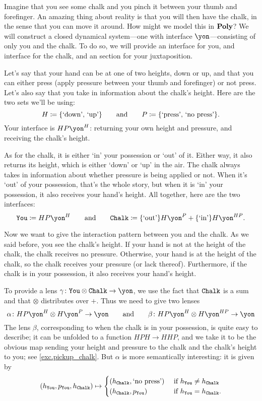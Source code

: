 \documentclass[Book-Poly]{subfiles}
\begin{document}
\begin{example}\label{ex.pickup_chalk}
Imagine that you see some chalk and you pinch it between your thumb and forefinger.
An amazing thing about reality is that you will then have the chalk, in the sense that you can move it around.
How might we model this in $\mathbf{Poly}$?
We will construct a closed dynamical system---one with interface $\yon$---consisting of only you and the chalk.
To do so, we will provide an interface for you, and interface for the chalk, and an section for your juxtaposition.

Let's say that your hand can be at one of two heights, down or up, and that you can either press (apply pressure between your thumb and forefinger) or not press. Let's also say that you take in information about the chalk's height. Here are the two sets we'll be using:
\[
	H\coloneqq\{\text{`down', `up'}\}
	\qquad\text{and}\qquad
	P\coloneqq\{\text{`press', `no press'}\}.
\]
Your interface is $HP\yon^H$: returning your own height and pressure, and receiving the chalk's height.

As for the chalk, it is either `in' your possession or `out' of it.
Either way, it also returns its height, which is either `down' or `up' in the air.
The chalk always takes in information about whether pressure is being applied or not.
When it's `out' of your possession, that's the whole story, but when it is `in' your possession, it also receives your hand's height.
All together, here are the two interfaces:
\[
	\const{You}\coloneqq HP\yon^H
	\qqand
	\const{Chalk}\coloneqq \{\text{`out'}\}H\yon^P + \{\text{`in'}\}H\yon^{HP}.
\]

Now we want to give the interaction pattern between you and the chalk.
As we said before, you see the chalk's height.
If your hand is not at the height of the chalk, the chalk receives no pressure.
Otherwise, your hand is at the height of the chalk, so the chalk receives your pressure (or lack thereof).
Furthermore, if the chalk is in your possession, it also receives your hand's height.

To provide a lens $\gamma\colon\const{You}\otimes\const{Chalk}\to\yon$, we use the fact that $\texttt{Chalk}$ is a sum and that $\otimes$ distributes over $+$.
Thus we need to give two lenses
\[
	\alpha\colon HP\yon^H\otimes H\yon^P\to\yon
	\qqand
	\beta\colon HP\yon^H\otimes H\yon^{HP}\to\yon
\]
The lens $\beta$, corresponding to when the chalk is in your possession, is quite easy to describe; it can be unfolded to a function
$HPH\to HHP$, and we take it to be the obvious map sending your height and pressure to the chalk and the chalk's height to you; see \cref{exc.pickup_chalk}. But $\alpha$ is more semantically interesting: it is given by
\[
  (h_{\texttt{You}},p_{\texttt{You}},h_{\texttt{Chalk}})\mapsto
  \begin{cases}
  	(h_{\texttt{Chalk}},\text{`no press'}) & \textnormal{ if } h_{\texttt{You}} \neq h_{\texttt{Chalk}} \\
  	(h_{\texttt{Chalk}},p_{\texttt{You}}) & \textnormal{ if } h_{\texttt{You}} = h_{\texttt{Chalk}}.
  \end{cases}
\]


\end{example}
\end{document}
